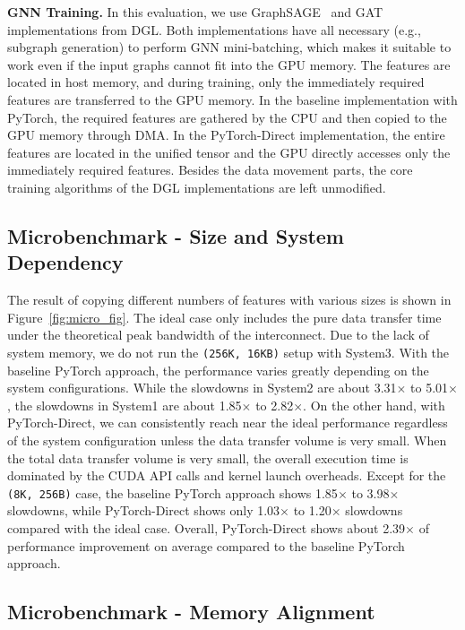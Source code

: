 \noindent\textbf{GNN Training.} In this evaluation, we use GraphSAGE~\cite{hamilton2017inductive} and GAT~\cite{attention2018graph} implementations from DGL.
Both implementations have all necessary  (e.g., subgraph generation) to perform GNN mini-batching, which makes it suitable to work even if the input graphs cannot fit into the GPU memory.
The features are located in host memory, and during training, only the immediately required features are transferred to the GPU memory.
In the baseline implementation with PyTorch, the required features are gathered by the CPU and then copied to the GPU memory through DMA.
In the PyTorch-Direct implementation, the entire features are located in the unified tensor and the GPU directly accesses only the immediately required features.
Besides the data movement parts, the core training algorithms of the DGL implementations are left unmodified.

\subsection{Microbenchmark - Size and System Dependency}
\label{sec.evaluation.microbenchmarkI}


The result of copying different numbers of features with various sizes is shown in Figure~\ref{fig:micro_fig}.
The ideal case only includes the pure data transfer time under the theoretical peak bandwidth of the interconnect.
Due to the lack of system memory, we do not run the \texttt{(256K, 16KB)} setup with System3.
With the baseline PyTorch approach, the performance varies greatly depending on the system configurations.
While the slowdowns in System2 are about 3.31$\times$ to 5.01$\times$, the slowdowns in System1 are about 1.85$\times$ to 2.82$\times$.
On the other hand, with PyTorch-Direct, we can consistently reach near the ideal performance regardless of the system configuration unless the data transfer volume is very small.
When the total data transfer volume is very small, the overall execution time is dominated by the CUDA API calls and kernel launch overheads.
Except for the \texttt{(8K, 256B)} case, the baseline PyTorch approach shows 1.85$\times$ to 3.98$\times$ slowdowns, while PyTorch-Direct shows only 1.03$\times$ to 1.20$\times$ slowdowns compared with the ideal case.
Overall, PyTorch-Direct shows about 2.39$\times$ of performance improvement on average compared to the baseline PyTorch approach.


\subsection{Microbenchmark - Memory Alignment}


